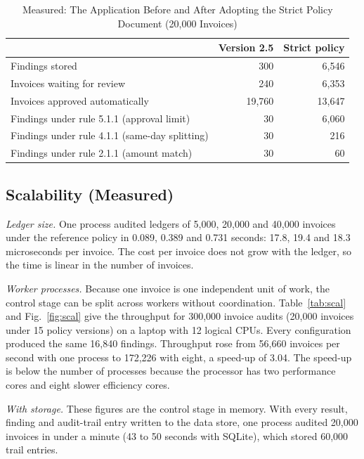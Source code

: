 \documentclass[conference]{IEEEtran}
\begin{document}
\begin{table}[t]
\caption{Measured: The Application Before and After Adopting the Strict Policy Document (20{,}000 Invoices)}
\label{tab:app}
\centering
\footnotesize
\begin{tabular}{L{4.6cm}rr}
\toprule
 & Version 2.5 & Strict policy \\
\midrule
Findings stored & 300 & 6{,}546 \\
Invoices waiting for review & 240 & 6{,}353 \\
Invoices approved automatically & 19{,}760 & 13{,}647 \\
Findings under rule 5.1.1 (approval limit) & 30 & 6{,}060 \\
Findings under rule 4.1.1 (same-day splitting) & 30 & 216 \\
Findings under rule 2.1.1 (amount match) & 30 & 60 \\
\bottomrule
\end{tabular}
\end{table}

\subsection{Scalability (Measured)}
\label{sec:scal}
\textit{Ledger size.} One process audited ledgers of 5{,}000, 20{,}000 and 40{,}000 invoices under the reference policy in 0.089, 0.389 and 0.731 seconds: 17.8, 19.4 and 18.3 microseconds per invoice. The cost per invoice does not grow with the ledger, so the time is linear in the number of invoices.

\textit{Worker processes.} Because one invoice is one independent unit of work, the control stage can be split across workers without coordination. Table~\ref{tab:scal} and Fig.~\ref{fig:scal} give the throughput for 300{,}000 invoice audits (20{,}000 invoices under 15 policy versions) on a laptop with 12 logical CPUs. Every configuration produced the same 16{,}840 findings. Throughput rose from 56{,}660 invoices per second with one process to 172{,}226 with eight, a speed-up of 3.04. The speed-up is below the number of processes because the processor has two performance cores and eight slower efficiency cores.

\textit{With storage.} These figures are the control stage in memory. With every result, finding and audit-trail entry written to the data store, one process audited 20{,}000 invoices in under a minute (43 to 50 seconds with SQLite), which stored 60{,}000 trail entries.
\end{document}
